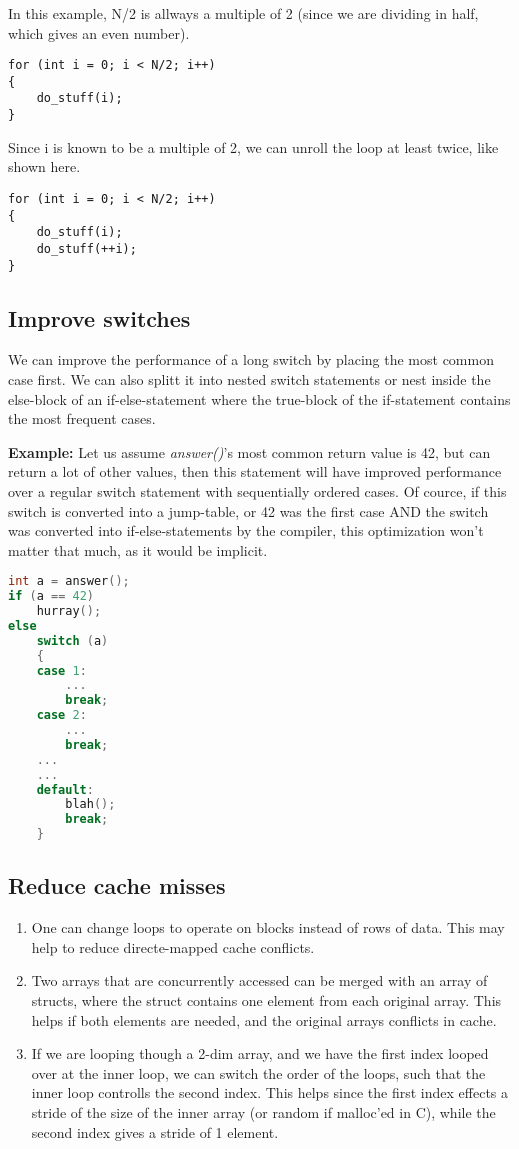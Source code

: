 \documentclass[english,a4paper,numbers=noenddot]{scrartcl}
\begin{document}
\subsubsection{}
\label{loop}
In this example, N/2 is allways a multiple of 2 (since we are dividing in half, which gives an even number).
\begin{lstlisting}
for (int i = 0; i < N/2; i++)
{
    do_stuff(i);
}
\end{lstlisting}
Since i is known to be a multiple of 2, we can unroll the loop at least twice, like shown here.
\begin{lstlisting}
for (int i = 0; i < N/2; i++)
{
    do_stuff(i);
    do_stuff(++i);
}
\end{lstlisting}
\newpage
\subsection{Improve switches}
We can improve the performance of a long switch by placing the most common case first. We can also splitt it into nested switch statements or nest inside the else-block
of an if-else-statement where the true-block of the if-statement contains the most frequent cases.

\textbf{Example:}
Let us assume \emph{answer()}'s most common return value is 42, but can return a lot of other values, then this statement will have improved performance
over a regular switch statement with sequentially ordered cases. Of cource, if this switch is converted into a jump-table, or 42 was the first case AND the
switch was converted into if-else-statements by the compiler, this optimization won't matter that much, as it would be implicit.
\begin{lstlisting}[language=C]
int a = answer();
if (a == 42)
    hurray();
else
    switch (a)
    {
	case 1:
	    ...
	    break;
	case 2:
	    ...
	    break;
	...
	...
	default:
	    blah();
	    break;
    }
\end{lstlisting}

\subsection{Reduce cache misses}
\begin{enumerate}
    \item One can change loops to operate on blocks instead of rows of data. This may help to reduce directe-mapped cache conflicts.
    \item Two arrays that are concurrently accessed can be merged with an array of structs, where the struct contains one element from each
	original array. This helps if both elements are needed, and the original arrays conflicts in cache.
    \item If we are looping though a 2-dim array, and we have the first index looped over at the inner loop, we can switch the order of the loops, such that the inner loop
	controlls the second index. This helps since the first index effects a stride of the size of the inner array (or random if malloc'ed in C), while the second index
	gives a stride of 1 element. 
\end{enumerate}
\end{document}
